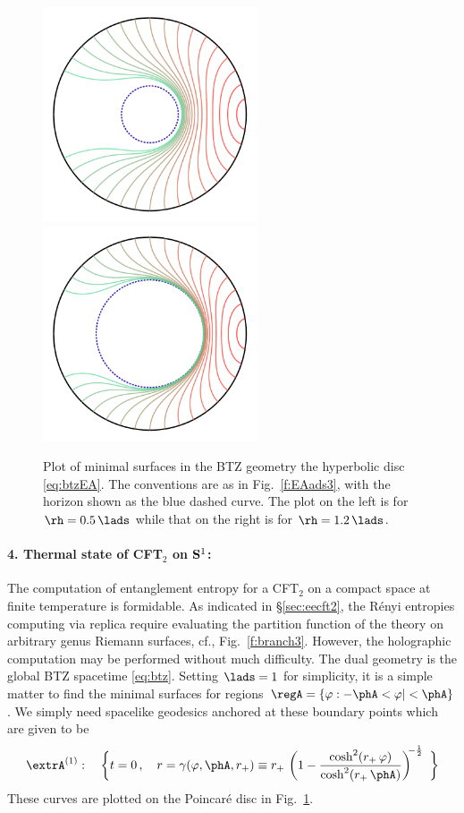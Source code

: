 \documentclass[12pt,openany]{book}
\begin{document}
\begin{figure}[htbp]
\begin{center}
\includegraphics[width=2.5in]{figures/EA-btz-rh0p5}
\hspace{2cm}
\includegraphics[width=2.5in]{figures/EA-btz-rh1p2}
\end{center}
\caption{Plot of minimal surfaces in the BTZ geometry the hyperbolic disc \eqref{eq:btzEA}. The conventions are as in
Fig.~\ref{f:EAads3}, with the horizon shown as the blue dashed curve. The plot on the left is for $\rh = 0.5\, \lads$
while that on the right is for $\rh =1.2 \,\lads$.}
\label{f:btzgeods}
\end{figure}
%

\paragraph{4. Thermal state of CFT$_2$ on ${\bf S}^1$:} The computation of entanglement entropy for a CFT$_2$ on a compact space at finite temperature is formidable. As indicated in \S\ref{sec:eecft2}, the R\'enyi entropies computing via replica require evaluating the partition function of the theory on arbitrary genus Riemann surfaces, cf., Fig.~\ref{f:branch3}. However, the holographic computation may be performed without much difficulty. The dual geometry is the global BTZ spacetime \eqref{eq:btz}. Setting $\lads=1$ for simplicity,  it is a simple matter to find the minimal surfaces for regions $\regA = \{\varphi: -\phA < \varphi| < \phA\}$. We simply need spacelike geodesics anchored at these boundary points which are given to be \cite{Hubeny:2012wa}
%
\begin{equation}
 \extrA^{(1)}: \quad \bigg\{t=0\,, \quad
 r = \gamma(\varphi,\phA,r_+) \equiv r_+  \, \left( 1 - \frac{\cosh^2 (r_+ \, \varphi)}{ \cosh^2 (r_+ \, \phA)} \right)^{\! \! -\frac{1}{2}} \ \bigg\}
\label{eq:btzEA}
\end{equation}
%
These curves are  plotted on the  Poincar\'e disc in Fig.~\ref{f:btzgeods}.
\end{document}
